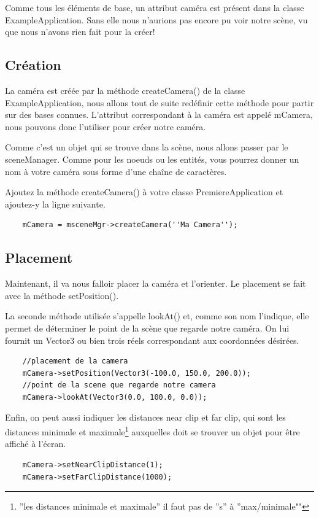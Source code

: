 Comme tous les \'el\'ements de base, un attribut cam\'era est pr\'esent dans la classe ExampleApplication. Sans elle nous n'aurions pas encore pu voir notre sc\`ene, vu que nous n'avons rien fait pour la cr\'eer!



\subsection{Cr\'eation}

La cam\'era est cr\'e\'ee par la m\'ethode  createCamera() de la classe ExampleApplication, nous allons tout de suite red\'efinir cette m\'ethode pour partir sur des bases connues. L'attribut correspondant \`{a} la cam\'era est appel\'e mCamera, nous pouvons donc l'utiliser pour cr\'eer notre cam\'era.

Comme c'est un objet qui se trouve dans la sc\`ene, nous allons passer par le sceneManager. Comme pour les noeuds ou les entit\'es, vous pourrez donner un nom \`{a} votre cam\'era sous forme d'une cha\^ine de caract\`eres.

Ajoutez la m\'ethode createCamera() \`{a} votre classe PremiereApplication et ajoutez-y la ligne suivante.

\begin{lstlisting}
	mCamera = msceneMgr->createCamera(''Ma Camera'');
\end{lstlisting}





\subsection{Placement}

Maintenant, il va nous falloir placer la cam\'era et l'orienter. Le placement se fait avec la m\'ethode setPosition(). 

La seconde m\'ethode utilis\'ee s'appelle lookAt() et, comme son nom l'indique, elle permet de d\'eterminer le point de la sc\`ene que regarde notre cam\'era. On lui fournit un Vector3 ou bien trois r\'eels correspondant aux coordonn\'ees d\'esir\'ees.

\begin{lstlisting}
	//placement de la camera
	mCamera->setPosition(Vector3(-100.0, 150.0, 200.0));
	//point de la scene que regarde notre camera
	mCamera->lookAt(Vector3(0.0, 100.0, 0.0));
\end{lstlisting}


Enfin, on peut aussi indiquer les distances near clip et far clip, qui sont les distances minimale et maximale\footnote{''les distances minimale et maximale'' il faut pas de ''s'' \`{a} ''max/minimale""} auxquelles doit se trouver un objet pour \^etre affich\'e \`{a} l'\'ecran.
\begin{lstlisting}
	mCamera->setNearClipDistance(1);
	mCamera->setFarClipDistance(1000);
\end{lstlisting}




